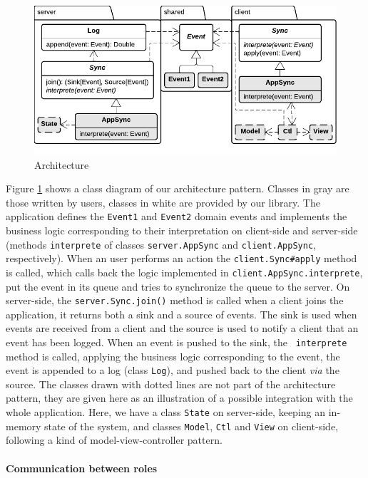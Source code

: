 \documentclass{llncs}
\begin{document}
\begin{figure}
\centering
\includegraphics[width=12cm]{classes2.pdf}
\caption{Architecture}
\label{fig-classes-2}
\end{figure}

Figure \ref{fig-classes-2} shows a class diagram of our architecture pattern. Classes in gray are those written by users, classes in white are provided by our library. The application defines the {\tt Event1} and {\tt Event2} domain events and implements the business logic corresponding to their interpretation on client-side and server-side (methods {\tt interprete} of classes {\tt server.AppSync} and {\tt client.AppSync}, respectively). When an user performs an action the {\tt client.Sync\#apply} method is called, which calls back the logic implemented in {\tt client.AppSync.interprete}, put the event in its queue and tries to synchronize the queue to the server. On server-side, the {\tt server.Sync.join()} method is called when a client joins the application, it returns both a sink and a source of events. The sink is used when events are received from a client and the source is used to notify a client that an event has been logged. When an event is pushed to the sink, the {\tt 
interprete} method is called, applying the business logic corresponding to the event, the event is appended to a log (class {\tt Log}), and pushed back to the client \emph{via} the source. The classes drawn with dotted lines are not part of the architecture pattern, they are given here as an illustration of a possible integration with the whole application. Here, we have a class {\tt State} on server-side, keeping an in-memory state of the system, and classes {\tt Model}, {\tt Ctl} and {\tt View} on client-side, following a kind of model-view-controller pattern.

\paragraph{Communication between roles}
\end{document}
